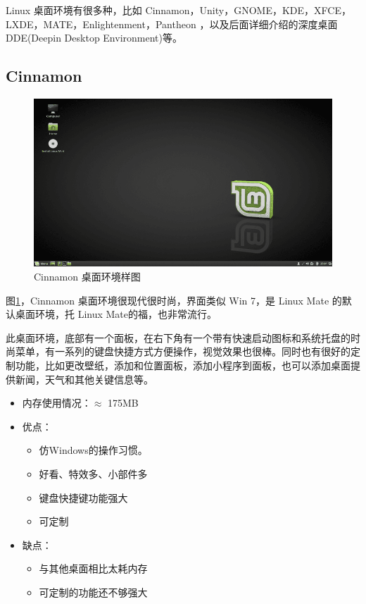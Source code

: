 \documentclass[doctor,openright,twoside]{sjtuthesis}
\providecommand{\tightlist}{%
    \setlength{\itemsep}{0pt}\setlength{\parskip}{0pt}}
\theoremstyle{plain}
\theoremstyle{definition}
\theoremstyle{remark}
\theoremstyle{ocrenumbox}
\theoremstyle{plain}
\begin{document}
Linux 桌面环境有很多种，比如
Cinnamon，Unity，GNOME，KDE，XFCE，LXDE，MATE，Enlightenment，Pantheon
，以及后面详细介绍的深度桌面 DDE(Deepin Desktop Environment)等。

\hypertarget{cinnamon}{%
\subsection{Cinnamon}\label{cinnamon}}

\begin{figure}
\includegraphics{de-Cinnamon} \caption[Cinnamon 桌面环境样图]{Cinnamon 桌面环境样图}\label{fig:de-Cinnamon}
\end{figure}

图\ref{fig:de-Cinnamon}，Cinnamon 桌面环境很现代很时尚，界面类似 Win
7，是 Linux Mate 的默认桌面环境，托 Linux Mate的福，也非常流行。

此桌面环境，底部有一个面板，在右下角有一个带有快速启动图标和系统托盘的时尚菜单，有一系列的键盘快捷方式方便操作，视觉效果也很棒。同时也有很好的定制功能，比如更改壁纸，添加和位置面板，添加小程序到面板，也可以添加桌面提供新闻，天气和其他关键信息等。

\begin{itemize}
\tightlist
\item
  内存使用情况：\(\approx\) 175MB
\item
  优点：

  \begin{itemize}
  \tightlist
  \item
    仿Windows的操作习惯。
  \item
    好看、特效多、小部件多
  \item
    键盘快捷键功能强大
  \item
    可定制
  \end{itemize}
\item
  缺点：

  \begin{itemize}
  \tightlist
  \item
    与其他桌面相比太耗内存
  \item
    可定制的功能还不够强大
  \end{itemize}
\end{itemize}
\end{document}
